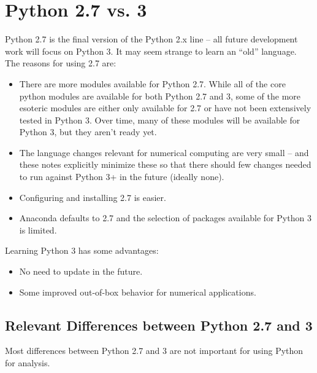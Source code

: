 \documentclass[KSmain.tex]{subfiles}
\begin{document}
 
\section{Python 2.7 vs. 3}
Python 2.7 is the final version of the Python 2.x line – all future development work will focus on Python 3.
It may seem strange to learn an “old” language. The reasons for using 2.7 are:
\begin{itemize}
\item There are more modules available for Python 2.7. While all of the core python modules are available
for both Python 2.7 and 3, some of the more esoteric modules are either only available for 2.7 or
have not been extensively tested in Python 3. Over time, many of these modules will be available for
Python 3, but they aren’t ready yet.
\item The language changes relevant for numerical computing are very small – and these notes explicitly
minimize these so that there should few changes needed to run against Python 3+ in the future
(ideally none).
\item Configuring and installing 2.7 is easier.
\item Anaconda defaults to 2.7 and the selection of packages available for Python 3 is limited.
\end{itemize}
Learning Python 3 has some advantages:
\begin{itemize}
\item No need to update in the future.
\item Some improved out-of-box behavior for numerical applications.
\end{itemize}

\subsection{Relevant Differences between Python 2.7 and 3}
Most differences between Python 2.7 and 3 are not important for using Python for analysis. 

\end{document}
